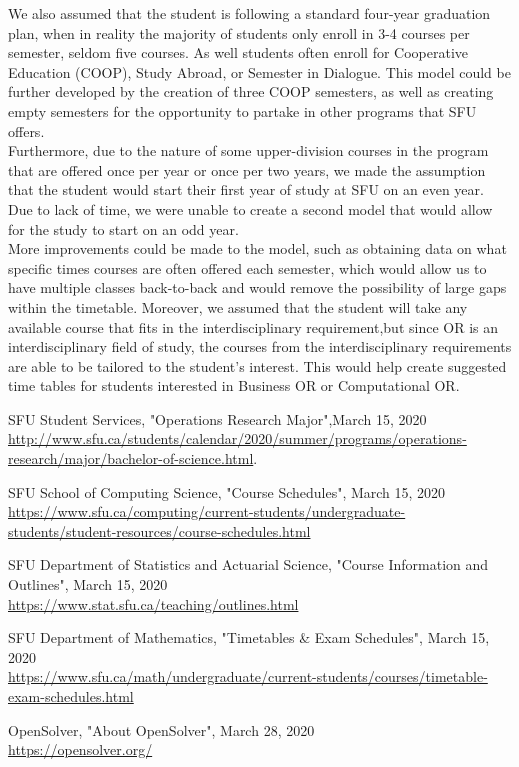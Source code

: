 \documentclass{article}
\begin{document}
We also assumed that the student is following a standard four-year graduation plan, when in reality the majority of students only enroll in 3-4 courses per semester, seldom five courses. As well students often enroll for Cooperative Education (COOP), Study Abroad, or Semester in Dialogue. This model could be further developed by the creation of three COOP semesters, as well as creating empty semesters for the opportunity to partake in other programs that SFU offers.\\

Furthermore, due to the nature of some upper-division courses in the program that are offered once per year or once per two years, we made the assumption that the student would start their first year of study at SFU on an even year. Due to lack of time, we were unable to create a second model that would allow for the study to start on an odd year.\\

More improvements could be made to the model, such as obtaining data on what specific times courses are often offered each semester, which would allow us to have multiple classes back-to-back and would remove the possibility of large gaps within the timetable. Moreover, we assumed that the student will take any available course that fits in the interdisciplinary requirement,but since OR is an interdisciplinary field of study, the courses from the interdisciplinary requirements are able to be tailored to the student's interest. This would help create suggested time tables for students interested in Business OR or Computational OR. 



\newpage
\begin{thebibliography}{9}

SFU Student Services, "Operations Research Major",March 15, 2020
\\\url{http://www.sfu.ca/students/calendar/2020/summer/programs/operations-research/major/bachelor-of-science.html}. 

SFU School of Computing Science, "Course Schedules", March 15, 2020
\\\url{https://www.sfu.ca/computing/current-students/undergraduate-students/student-resources/course-schedules.html}

SFU Department of Statistics and Actuarial Science, "Course Information and Outlines", March 15, 2020
\\\url{https://www.stat.sfu.ca/teaching/outlines.html}

SFU Department of Mathematics, "Timetables \& Exam Schedules", March 15, 2020
\\\url{https://www.sfu.ca/math/undergraduate/current-students/courses/timetable-exam-schedules.html}

OpenSolver, "About OpenSolver", March 28, 2020
\\\url{https://opensolver.org/}




\end{thebibliography}
\end{document}
